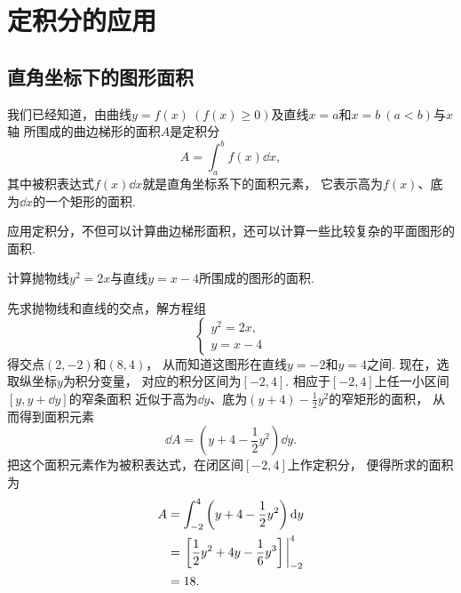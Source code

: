 \section{定积分的应用}
\subsection{直角坐标下的图形面积}
我们已经知道，由曲线\(y=f(x)\ (f(x)\geq0)\)及直线\(x=a\)和\(x=b\ (a<b)\)与\(x\)轴
所围成的曲边梯形的面积\(A\)是定积分\[
	A = \int_a^b f(x) \dd{x},
\]
其中被积表达式\(f(x) \dd{x}\)就是直角坐标系下的面积元素，
它表示高为\(f(x)\)、底为\(\dd{x}\)的一个矩形的面积.

应用定积分，不但可以计算曲边梯形面积，还可以计算一些比较复杂的平面图形的面积.

\begin{example}
计算抛物线\(y^2=2x\)与直线\(y=x-4\)所围成的图形的面积.
\begin{solution}
先求抛物线和直线的交点，解方程组\[
	\left\{ \begin{array}{l}
		y^2=2x, \\
		y=x-4
	\end{array} \right.
\]得交点\((2,-2)\)和\((8,4)\)，
从而知道这图形在直线\(y=-2\)和\(y=4\)之间.
现在，选取纵坐标\(y\)为积分变量，
对应的积分区间为\([-2,4]\).
相应于\([-2,4]\)上任一小区间\([y,y+\dd{y}]\)的窄条面积
近似于高为\(\dd{y}\)、底为\((y+4)-\frac12y^2\)的窄矩形的面积，
从而得到面积元素\[
	\dd{A} = \left(y+4-\frac12y^2\right) \dd{y}.
\]
把这个面积元素作为被积表达式，在闭区间\([-2,4]\)上作定积分，
便得所求的面积为\begin{align*}
	A &= \int_{-2}^4 \left(y+4-\frac12y^2\right) \dd{y} \\
	&= \eval{\left[\frac12y^2+4y-\frac16y^3\right]}_{-2}^4 \\
	&= 18.
\end{align*}
\end{solution}
\end{example}

